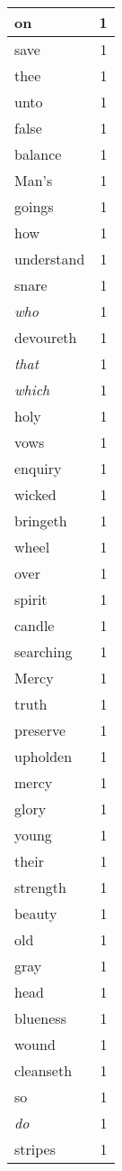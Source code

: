 \begin{center}
\begin{longtable}{l|r}
on & 1\\ \hline 
save & 1\\ \hline 
thee & 1\\ \hline 
unto & 1\\ \hline 
false & 1\\ \hline 
balance & 1\\ \hline 
Man's & 1\\ \hline 
goings & 1\\ \hline 
how & 1\\ \hline 
understand & 1\\ \hline 
snare & 1\\ \hline 
\emph{who} & 1\\ \hline 
devoureth & 1\\ \hline 
\emph{that} & 1\\ \hline 
\emph{which} & 1\\ \hline 
holy & 1\\ \hline 
vows & 1\\ \hline 
enquiry & 1\\ \hline 
wicked & 1\\ \hline 
bringeth & 1\\ \hline 
wheel & 1\\ \hline 
over & 1\\ \hline 
spirit & 1\\ \hline 
candle & 1\\ \hline 
searching & 1\\ \hline 
Mercy & 1\\ \hline 
truth & 1\\ \hline 
preserve & 1\\ \hline 
upholden & 1\\ \hline 
mercy & 1\\ \hline 
glory & 1\\ \hline 
young & 1\\ \hline 
their & 1\\ \hline 
strength & 1\\ \hline 
beauty & 1\\ \hline 
old & 1\\ \hline 
gray & 1\\ \hline 
head & 1\\ \hline 
blueness & 1\\ \hline 
wound & 1\\ \hline 
cleanseth & 1\\ \hline 
so & 1\\ \hline 
\emph{do} & 1\\ \hline 
stripes & 1\\ \hline 
\end{longtable}  
\end{center}  


